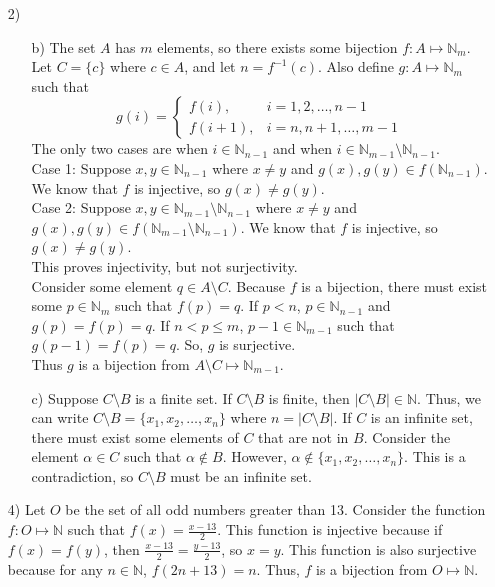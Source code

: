 \documentclass[11pt]{article}
\newcommand{\N}{\mathbb{N}}    %
\begin{document}
  \begin{enumerate}
    \item[2)] \begin{enumerate}
      \item[b)] The set $A$ has $m$ elements, so there exists some bijection $f:A \mapsto \N_m$. Let $C = \{c \}$ where $c \in A$, and let $n=f^{-1}(c)$. Also define $g:A \mapsto \N_m$ such that
                \[ g(i) = \begin{cases}
                    f(i), & i = 1, 2, \ldots, n-1 \\
                    f(i+1), & i = n, n+1, \ldots, m-1
                \end{cases} \]
                The only two cases are when $i \in \N_{n-1}$ and when $i \in \N_{m-1}\setminus \N_{n-1}$. \\
                Case 1: Suppose $x, y \in \N_{n-1}$ where $x \neq y$ and $g(x), g(y) \in f(\N_{n-1})$. We know that $f$ is injective, so $g(x) \neq g(y)$. \\
                Case 2: Suppose $x, y \in \N_{m-1}\setminus \N_{n-1}$ where $x \neq y$ and $g(x), g(y) \in f(\N_{m-1}\setminus \N_{n-1})$. We know that $f$ is injective, so $g(x) \neq g(y)$. \\
                This proves injectivity, but not surjectivity. \\
                Consider some element $q \in A \setminus C$. Because $f$ is a bijection, there must exist some $p \in \N_m$ such that $f(p) = q$. If $p < n$, $p \in \N_{n-1}$ and $g(p)=f(p)=q$. If $n < p \leq m$, $p-1 \in \N_{m-1}$ such that $g(p-1) = f(p) = q$. So, $g$ is surjective. \\
                Thus $g$ is a bijection from $A \setminus C \mapsto \N_{m-1}$.
      \item[c)] Suppose $C \setminus B$ is a finite set. If $C \setminus B$ is finite, then $\vert C \setminus B \vert \in \N$. Thus, we can write $C \setminus B = \{x_1, x_2, \ldots, x_n \}$ where $n=\vert C \setminus B \vert$. If $C$ is an infinite set, there must exist some elements of $C$ that are not in $B$. Consider the element $\alpha \in C$ such that $\alpha \notin B$. However, $\alpha \notin \{x_1, x_2, \ldots, x_n \}$. This is a contradiction, so $C \setminus B$ must be an infinite set.
    \end{enumerate}
    \item[4)] Let $O$ be the set of all odd numbers greater than 13. Consider the function $f:O \mapsto \N$ such that $f(x) = \frac{x-13}{2}$. This function is injective because if $f(x) = f(y)$, then $\frac{x-13}{2} = \frac{y-13}{2}$, so $x=y$. This function is also surjective because for any $n \in \N$, $f(2n+13) = n$. Thus, $f$ is a bijection from $O \mapsto \N$.

\end{enumerate}
\end{document}

